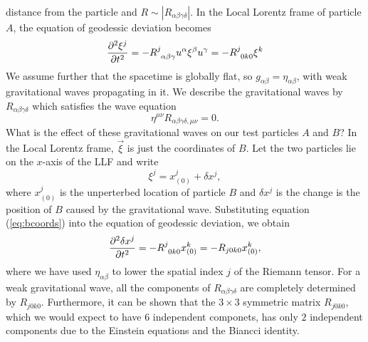 distance from the particle and $R \sim |R_{\alpha\beta\gamma\delta}|$. In the
Local Lorentz frame of particle $A$, the equation of geodessic deviation
becomes
\begin{equation}
\frac{\partial^2 \xi^{j}}{\partial t^2} = -
\tensor{R}{^j_{\alpha\beta\gamma}}u^\alpha\xi^\beta u^\gamma =
-\tensor{R}{^j_{0k0}} \xi^k
\end{equation}
We assume further that the spacetime is globally flat, so $g_{\alpha\beta} =
\eta_{\alpha\beta}$, with weak gravitational waves propagating in it. We
describe the gravitational waves by $R_{\alpha\beta\gamma\delta}$ which
satisfies the wave equation
\begin{equation}
\eta^{\mu\nu}R_{\alpha\beta\gamma\delta,\mu\nu} = 0.
\end{equation}
What is the effect of these gravitational waves on our test particles $A$ and
$B$? In the Local Lorentz frame, $\vec{\xi}$ is just the coordinates of $B$.
Let the two particles lie on the $x$-axis of the LLF and write
\begin{equation}
\label{eq:bcoords}
\xi^j = x_{(0)}^j + \delta x^j,
\end{equation}
where $x_{(0)}^j$ is the unperterbed location of particle $B$ and $\delta x^j$
is the change is the position of $B$ caused by the gravitational wave.
Substituting equation (\ref{eq:bcoords}) into the equation of geodessic
deviation, we obtain
\begin{equation}
\label{eq:particledev}
\frac{\partial^2 \delta x^j}{\partial t^2} = - \tensor{R}{^j_{0k0}} x_{(0)}^k =
-R_{j0k0} x_{(0)}^k,
\end{equation}
where we have used $\eta_{\alpha\beta}$ to lower the spatial index $j$ of the
Riemann tensor. For a weak gravitational wave, all the components of
$R_{\alpha\beta\gamma\delta}$ are completely determined by $R_{j0k0}$.
Furthermore, it can be shown that the $3\times3$ symmetric matrix $R_{j0k0}$,
which we would expect to have $6$ independent componets, has only $2$
independent components due to the Einstein equations and the Biancci identity.

